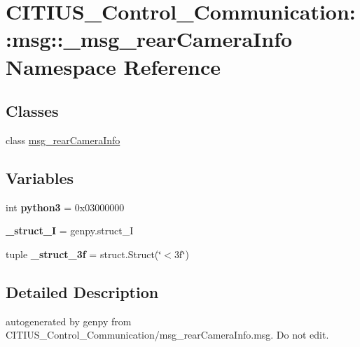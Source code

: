 \hypertarget{namespace_c_i_t_i_u_s___control___communication_1_1msg_1_1__msg__rear_camera_info}{\section{\-C\-I\-T\-I\-U\-S\-\_\-\-Control\-\_\-\-Communication\-:\-:msg\-:\-:\-\_\-msg\-\_\-rear\-Camera\-Info \-Namespace \-Reference}
\label{namespace_c_i_t_i_u_s___control___communication_1_1msg_1_1__msg__rear_camera_info}
}
\subsection*{\-Classes}
\begin{DoxyCompactItemize}
\item 
class \hyperlink{class_c_i_t_i_u_s___control___communication_1_1msg_1_1__msg__rear_camera_info_1_1msg__rear_camera_info}{msg\-\_\-rear\-Camera\-Info}
\end{DoxyCompactItemize}
\subsection*{\-Variables}
\begin{DoxyCompactItemize}
\item 
\hypertarget{namespace_c_i_t_i_u_s___control___communication_1_1msg_1_1__msg__rear_camera_info_a9b73e176e8a6ea8d2cb745a9c336373a}{int {\bfseries python3} = 0x03000000}\label{namespace_c_i_t_i_u_s___control___communication_1_1msg_1_1__msg__rear_camera_info_a9b73e176e8a6ea8d2cb745a9c336373a}

\item 
\hypertarget{namespace_c_i_t_i_u_s___control___communication_1_1msg_1_1__msg__rear_camera_info_a46bc9ce5d12a4f5af82eda06b068d00a}{{\bfseries \-\_\-struct\-\_\-\-I} = genpy.\-struct\-\_\-\-I}\label{namespace_c_i_t_i_u_s___control___communication_1_1msg_1_1__msg__rear_camera_info_a46bc9ce5d12a4f5af82eda06b068d00a}

\item 
\hypertarget{namespace_c_i_t_i_u_s___control___communication_1_1msg_1_1__msg__rear_camera_info_a1f5810e5bcc4ac8859ccecb04d70733e}{tuple {\bfseries \-\_\-struct\-\_\-3f} = struct.\-Struct(\char`\"{}$<$3f\char`\"{})}\label{namespace_c_i_t_i_u_s___control___communication_1_1msg_1_1__msg__rear_camera_info_a1f5810e5bcc4ac8859ccecb04d70733e}

\end{DoxyCompactItemize}


\subsection{\-Detailed \-Description}
\begin{DoxyVerb}autogenerated by genpy from CITIUS_Control_Communication/msg_rearCameraInfo.msg. Do not edit.\end{DoxyVerb}
 